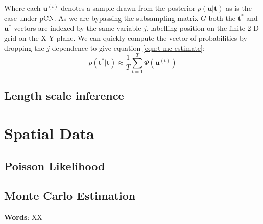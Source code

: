 \documentclass[]{article}
\newcommand{\tbold}{\boldsymbol{t}}
\newcommand{\ubold}{\boldsymbol{u}}
\begin{document}
Where each $\ubold^{(t)}$ denotes a sample drawn from the posterior $p(\ubold | \tbold)$ as is the case under pCN. As we are bypassing the subsampling matrix $G$ both the $\tbold^*$ and $\ubold^*$ vectors are indexed by the same variable $j$, labelling position on the finite 2-D grid on the X-Y plane. We can quickly compute the vector of probabilities by dropping the $j$ dependence to give equation \ref{eqn:t-mc-estimate}:
%
\begin{equation}
	p(\tbold^* | \tbold) \approx \frac{1}{T} \sum_{t=1}^{T} \Phi \left( \ubold^{(t)} \right)
	\label{eqn:t-mc-estimate}
\end{equation}
\subsection{Length scale inference}

\section{Spatial Data}

\subsection{Poisson Likelihood}

\subsection{Monte Carlo Estimation}

\textbf{Words}: XX
\end{document}
